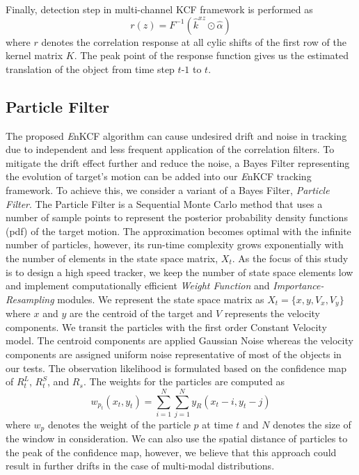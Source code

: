 \documentclass{bmvc2k}
\begin{document}
Finally, detection step in multi-channel KCF framework is performed as
\begin{equation}
r(z) = F^{-1}(\hat{k}^{xz} \odot \hat{\alpha})
\end{equation}
where $r$ denotes the correlation response at all cylic shifts of the
first row of the kernel matrix $K$. The peak point of the response
function gives us the estimated translation of the object from time
step $t$-$1$ to $t$.

\subsection{Particle Filter} \label{sc:PF}
The proposed {\it E}nKCF algorithm can cause undesired drift and noise in
tracking due to independent and less frequent application of the correlation filters. To
mitigate the drift effect further and reduce the noise, a Bayes Filter
representing the evolution of target's motion can be added into our
{\it E}nKCF tracking framework. To achieve this, we consider a variant of a
Bayes Filter, \textit{Particle Filter}. The Particle Filter is a
Sequential Monte Carlo method that uses a number of sample points to represent
the posterior probability density functions (pdf) of the target motion. 
The approximation becomes optimal with the infinite number of particles,
however, its run-time complexity grows exponentially with the number
of elements in the state space matrix, $X_{t}$. As the focus of this
study is to design a high speed tracker, we keep the number of state
space elements low and implement computationally efficient \textit{Weight
  Function} and \textit{Importance-Resampling} modules. We represent
the state space matrix as $X_{t} = \lbrace x,y,V_{x},V_{y}\rbrace$
where $x$ and $y$ are the centroid of the target and $V$ represents
the velocity components. We transit the particles with the first order Constant Velocity model. The centroid components are applied Gaussian Noise whereas the velocity components are assigned
uniform noise representative of most of the objects in our tests. The observation
likelihood is formulated based on the confidence map of $R_{t}^{L}$, $R_{t}^{S}$, and $R_{s}$. 
The weights for the particles are computed as
\begin{equation}
	w_{p_{t}}(x_{t},y_{t}) = \sum_{i=1}^{N}\sum_{j=1}^{N} y_{R}(x_{t}-i,y_{t}-j)
\end{equation}
where $w_{p}$ denotes the weight of the particle $p$ at time $t$ and $N$ denotes the size of the window in consideration. We can also use the spatial distance of particles to the peak of the confidence map, however, we believe that this approach could result in further drifts in the case of multi-modal distributions. 
 
\end{document}
